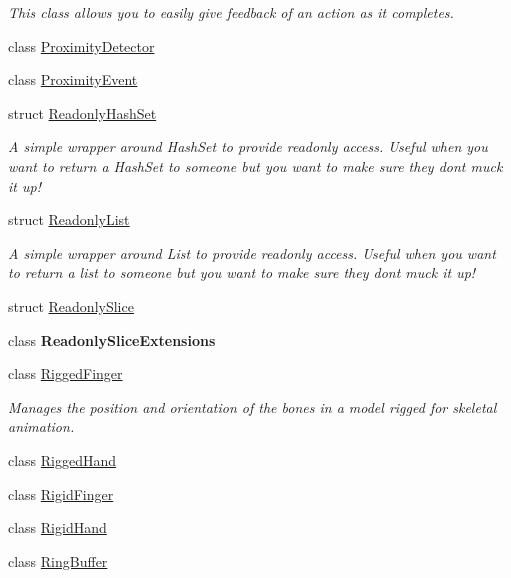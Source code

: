 \begin{DoxyCompactItemize}
\begin{DoxyCompactList}\small\item\em This class allows you to easily give feedback of an action as it completes. \end{DoxyCompactList}\item 
class \mbox{\hyperlink{class_leap_1_1_unity_1_1_proximity_detector}{Proximity\+Detector}}
\item 
class \mbox{\hyperlink{class_leap_1_1_unity_1_1_proximity_event}{Proximity\+Event}}
\item 
struct \mbox{\hyperlink{struct_leap_1_1_unity_1_1_readonly_hash_set}{Readonly\+Hash\+Set}}
\begin{DoxyCompactList}\small\item\em A simple wrapper around Hash\+Set to provide readonly access. Useful when you want to return a Hash\+Set to someone but you want to make sure they don\textquotesingle{}t muck it up! \end{DoxyCompactList}\item 
struct \mbox{\hyperlink{struct_leap_1_1_unity_1_1_readonly_list}{Readonly\+List}}
\begin{DoxyCompactList}\small\item\em A simple wrapper around List to provide readonly access. Useful when you want to return a list to someone but you want to make sure they don\textquotesingle{}t muck it up! \end{DoxyCompactList}\item 
struct \mbox{\hyperlink{struct_leap_1_1_unity_1_1_readonly_slice}{Readonly\+Slice}}
\item 
class {\bfseries Readonly\+Slice\+Extensions}
\item 
class \mbox{\hyperlink{class_leap_1_1_unity_1_1_rigged_finger}{Rigged\+Finger}}
\begin{DoxyCompactList}\small\item\em Manages the position and orientation of the bones in a model rigged for skeletal animation. \end{DoxyCompactList}\item 
class \mbox{\hyperlink{class_leap_1_1_unity_1_1_rigged_hand}{Rigged\+Hand}}
\item 
class \mbox{\hyperlink{class_leap_1_1_unity_1_1_rigid_finger}{Rigid\+Finger}}
\item 
class \mbox{\hyperlink{class_leap_1_1_unity_1_1_rigid_hand}{Rigid\+Hand}}
\item 
class \mbox{\hyperlink{class_leap_1_1_unity_1_1_ring_buffer}{Ring\+Buffer}}

\end{DoxyCompactItemize}
